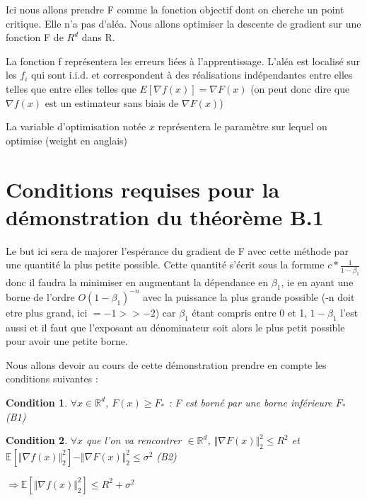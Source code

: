 \documentclass{article}
\begin{document}
\bigskip

Ici nous allons prendre F comme la fonction objectif dont on cherche un point critique. Elle n'a pas d'aléa. Nous allons optimiser la descente de gradient sur une fonction F de $R^d$ dans R. 

\bigskip

La fonction f représentera les erreurs liées à l'apprentissage. L'aléa est localisé sur les $f_i$ qui sont i.i.d. et correspondent à des réalisations indépendantes entre elles telles que entre elles telles que $E [ \nabla f(x)] = \nabla F(x)$ (on peut donc dire que $\nabla f(x)$ est un estimateur sans biais de $\nabla F(x)$)

\bigskip

La variable d'optimisation notée $x$ représentera le paramètre sur lequel on optimise (weight en anglais)

\bigskip

\section{Conditions requises pour la démonstration du théorème B.1}

Le but ici sera de majorer l'espérance du gradient de F avec cette méthode par une quantité la plus petite possible. Cette quantité s'écrit sous la formme $c*\frac{1}{1-\beta_1}$ donc il faudra la minimiser en augmentant la dépendance en $\beta_1$, ie en ayant une borne de l'ordre $O(1-\beta_1)^{-n}$ avec la puissance la plus grande possible (-n doit etre plus grand, ici $=-1 >> -2$) car $\beta_1$ étant compris entre 0 et 1, $1-\beta_1$ l'est aussi et il faut que l'exposant au dénominateur soit alors le plus petit possible pour avoir une petite borne.

\bigskip

Nous allons devoir au cours de cette démonstration prendre en compte les conditions suivantes :

\bigskip

\newtheorem{assumption}{Condition}
\begin{assumption}

$\forall x \in \mathbb{R}^d$, $F(x)\geq F_* $ : F est borné par une borne inférieure $F_*$ \hspace{\fill} (B1) 

\bigskip

\end{assumption}

\bigskip

\begin{assumption}

 $\forall x$ que l'on va rencontrer $\in \mathbb{R}^d$, $ \Vert \nabla F(x)  \Vert ^2_2 \leq R^2$ et $\mathbb{E}[ \Vert \nabla f(x) \Vert ^2_2]-  \Vert \nabla F(x)  \Vert ^2_2 \leq \sigma ^2$ \hspace{\fill}(B2) 

$\Rightarrow \mathbb{E}[ \Vert \nabla f(x) \Vert ^2_2] \leq R^2+ \sigma^2 $
\end{assumption}
\end{document}
